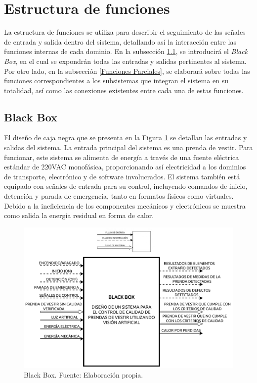 \section{Estructura de funciones}

La estructura de funciones se utiliza para describir el seguimiento de las señales de entrada y salida dentro del sistema, detallando así la interacción entre las funciones internas de cada dominio. En la subsección \ref{Black Box}, se introducirá el \textit{Black Box}, en el cual se expondrán todas las entradas y salidas pertinentes al sistema. Por otro lado, en la subsección \ref{Funciones Parciales}, se elaborará sobre todas las funciones correspondientes a los subsistemas que integran el sistema en su totalidad, así como las conexiones existentes entre cada una de estas funciones.

\subsection{Black Box}
\label{Black Box}

El diseño de caja negra que se presenta en la Figura \ref{fig:BLACK_BOX} se detallan las entradas y salidas del sistema. La entrada principal del sistema es una prenda de vestir. Para funcionar, este sistema se alimenta de energía a través de una fuente eléctrica estándar de 220VAC monofásica, proporcionando así electricidad a los dominios de transporte, electrónico y de software involucrados. El sistema también está equipado con señales de entrada para su control, incluyendo comandos de inicio, detención y parada de emergencia, tanto en formatos físicos como virtuales. Debido a la ineficiencia de los componentes mecánicos y electrónicos se muestra como salida la energía residual en forma de calor.

\begin{figure}[H]
    \centering
    \includegraphics[width=\textwidth]{img/BLACK_BOX.drawio.pdf}
    \caption[Black Box.]{Black Box. Fuente: Elaboración propia.}
    \label{fig:BLACK_BOX}
\end{figure}

